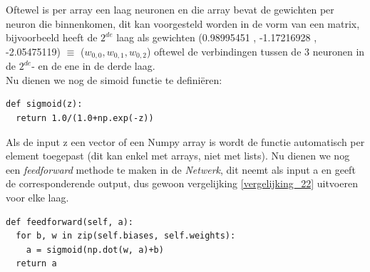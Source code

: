 \documentclass[10pt,a4paper,twoside]{article}
\begin{document}
Oftewel is per array een laag neuronen en die array bevat de gewichten per neuron die binnenkomen, dit kan voorgesteld worden in de vorm van een matrix, bijvoorbeeld heeft de $2^{de}$ laag als gewichten (0.98995451 , -1.17216928 , -2.05475119) $\equiv$ ($w_{0,0} , w_{0,1} , w_{0,2}$) oftewel de verbindingen tussen de 3 neuronen in de $2^{de}$- en de ene in de derde laag.\\
Nu dienen we nog de simoid functie te definiëren:
\begin{verbatim}
def sigmoid(z):
  return 1.0/(1.0+np.exp(-z))
\end{verbatim}
Als de input z een vector of een Numpy array is wordt de functie automatisch per element toegepast (dit kan enkel met arrays, niet met lists). Nu dienen we nog een \textit{feedforward} methode te maken in de \textit{Netwerk}, dit neemt als input a en geeft de corresponderende output, dus gewoon vergelijking \ref{vergelijking_22} uitvoeren voor elke laag.

\begin{verbatim}
def feedforward(self, a):
  for b, w in zip(self.biases, self.weights):
    a = sigmoid(np.dot(w, a)+b)
  return a
\end{verbatim}
\end{document}
